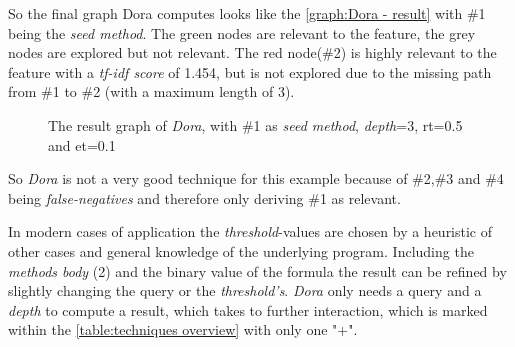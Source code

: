 So the final graph Dora computes looks like the \autoref{graph:Dora - result} with \#1 being the \textit{seed method}. The green nodes are relevant to the feature, the grey nodes are explored but not relevant. The red node(\#2) is highly relevant to the feature with a \emph{tf-idf score} of 1.454, but is not explored due to the missing path from \#1 to \#2 (with a maximum length of 3).
\begin{figure}[h]
	\centering
	\caption{The result graph of \textit{Dora}, with \#1 as \textit{seed method}, \textit{depth}=3, rt=0.5 and et=0.1}
	\label{graph:Dora - result}
\end{figure}
So \emph{Dora} is not a very good technique for this example because of \#2,\#3 and \#4 being \textit{false-negatives} and therefore only deriving \#1 as relevant.


 In modern cases of application the \textit{threshold}-values are chosen by a heuristic of other cases and general knowledge of the underlying program. Including the \textit{methods body} (2) and the binary value of the formula the result can be refined by slightly changing the query or the \textit{threshold's}. \newline
\emph{Dora} only needs a query and a \textit{depth} to compute a result, which takes to further interaction, which is marked within the \autoref{table:techniques overview} with only one "+".

